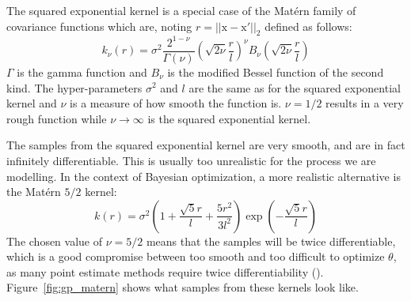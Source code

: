 The squared exponential kernel is a special case of the Matérn family of covariance functions which are, noting $r = || \mathrm{x} - \mathrm{x'} ||_2$ defined as follows:
\begin{equation}
    k_{\nu}(r) = \sigma^2 \frac{2^{1-\nu}}{\Gamma(\nu)} \left( \sqrt{2\nu} \frac{r}{l}\right)^{\nu} B_{\nu} \left( \sqrt{2\nu} \frac{r}{l}\right)
\end{equation}
$\Gamma$ is the gamma function and $B_{\nu}$ is the modified Bessel function of the second kind. The hyper-parameters $\sigma^2$ and $l$ are the same as for the squared exponential kernel and $\nu$ is a measure of how smooth the function is. $\nu = 1/2$ results in a very rough function while $\nu \to \infty$ is the squared exponential kernel.

The samples from the squared exponential kernel are very smooth, and are in fact infinitely differentiable. This is usually too unrealistic for the process we are modelling. In the context of Bayesian optimization, a more realistic alternative is the Matérn $5/2$ kernel:
\begin{equation}
    k(r) = \sigma^2 \left( 1 + \frac{\sqrt{5}r}{l} + \frac{5r^2}{3l^2} \right) \exp \left( - \frac{\sqrt{5}r}{l}\right)
\end{equation}
The chosen value of $\nu = 5/2$ means that the samples will be twice differentiable, which is a good compromise between too smooth and too difficult to optimize $\theta$, as many point estimate methods require twice differentiability (\textcite{snoek2012NIPS}). Figure~\ref{fig:gp_matern} shows what samples from these kernels look like.

